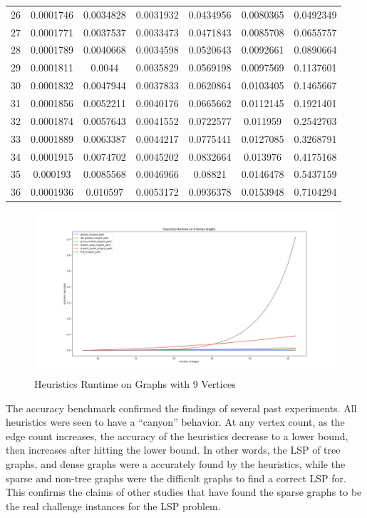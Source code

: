 \documentclass[twocolumn,showpacs,%
  nofootinbib,aps,superscriptaddress,%
  eqsecnum,prd,notitlepage,showkeys,11pt]{article}
\begin{document}
\begin{table}[htp]
\begin{tabular}{@{} *{7}{c} @{}}
 26 & 0.0001746 & 0.0034828 & 0.0031932 & 0.0434956 & 0.0080365 & 0.0492349 \\
 27 & 0.0001771 & 0.0037537 & 0.0033473 & 0.0471843 & 0.0085708 & 0.0655757 \\
 28 & 0.0001789 & 0.0040668 & 0.0034598 & 0.0520643 & 0.0092661 & 0.0890664 \\
 29 & 0.0001811 & 0.0044 & 0.0035829 & 0.0569198 & 0.0097569 & 0.1137601 \\
 30 & 0.0001832 & 0.0047944 & 0.0037833 & 0.0620864 & 0.0103405 & 0.1465667 \\
 31 & 0.0001856 & 0.0052211 & 0.0040176 & 0.0665662 & 0.0112145 & 0.1921401 \\
 32 & 0.0001874 & 0.0057643 & 0.0041552 & 0.0722577 & 0.011959 & 0.2542703 \\
 33 & 0.0001889 & 0.0063387 & 0.0044217 & 0.0775441 & 0.0127085 & 0.3268791 \\
 34 & 0.0001915 & 0.0074702 & 0.0045202 & 0.0832664 & 0.013976 & 0.4175168 \\
 35 & 0.000193 & 0.0085568 & 0.0046966 & 0.08821 & 0.0146478 & 0.5437159 \\
 36 & 0.0001936 & 0.010597 & 0.0053172 & 0.0936378 & 0.0153948 & 0.7104294
\end{tabular}
\end{table}

\begin{figure}[htp]
    \centering
    \includegraphics[width=\linewidth]{Runtime9VertexAll.png}
    \caption{Heuristics Runtime on Graphs with 9 Vertices}
    \label{fig:Runtime}
\end{figure}

The accuracy benchmark confirmed the findings of several past experiments. All heuristics were seen to have a ``canyon'' behavior. At any vertex count, as the edge count increases, the accuracy of the heuristics decrease to a lower bound, then increases after hitting the lower bound. In other words, the LSP of tree graphs, and dense graphs were a accurately found by the heuristics, while the sparse and non-tree graphs were the difficult graphs to find a correct LSP for. This confirms the claims of other studies that have found the sparse graphs to be the real challenge instances for the LSP problem. 
\end{document}
